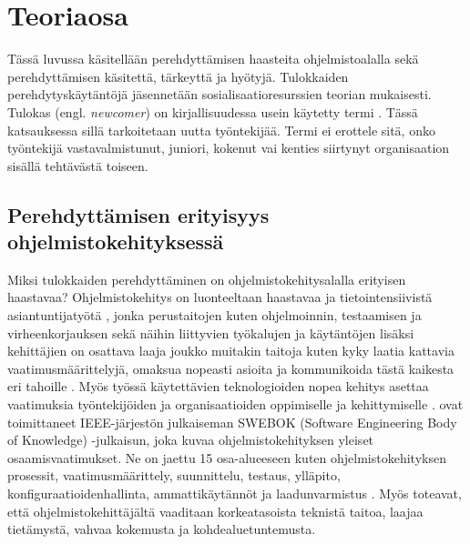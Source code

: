 \documentclass[utf8]{gradu3}
\begin{document}
\chapter{Teoriaosa}
\label{paaluku-teoria}

Tässä luvussa käsitellään perehdyttämisen haasteita ohjelmistoalalla sekä perehdyttämisen käsitettä, tärkeyttä ja hyötyjä. Tulokkaiden perehdytyskäytäntöjä jäsennetään sosialisaatioresurssien teorian \parencite{saks-gruman-2012} mukaisesti. Tulokas (engl. \textit{newcomer}) on kirjallisuudessa usein käytetty termi %
\parencites%
    [mm.][]{matturro-ym-2017}%
    {bauer-erdogan-2012}%
    {begel-simon-2008-all-over-again}%
    {steinmacher-ym-2015}%
    {britto-ym-2019}%
\relax.
%
Tässä katsauksessa sillä tarkoitetaan uutta työntekijää. Termi ei erottele sitä, onko työntekijä vastavalmistunut, juniori, kokenut vai kenties siirtynyt organisaation sisällä tehtävästä toiseen.

\section{Perehdyttämisen erityisyys ohjelmistokehityksessä}
\label{luku-perehdyttämisen-erityisyys-ohjelmistoalalla}

Miksi tulokkaiden perehdyttäminen on ohjelmistokehitysalalla erityisen haastavaa? Ohjelmistokehitys on luonteeltaan haastavaa ja tietointensiivistä asiantuntijatyötä \parencite{viana-ym-2014}, jonka perustaitojen kuten ohjelmoinnin, testaamisen ja virheenkorjauksen sekä näihin liittyvien työkalujen ja käytäntöjen lisäksi kehittäjien on osattava laaja joukko muitakin taitoja kuten kyky laatia kattavia vaatimusmäärittelyjä, omaksua nopeasti asioita ja kommunikoida tästä kaikesta eri tahoille %
\parencites%
    {tejera-hernández-ym-2018}%
    {begel-simon-2008-all-over-again}%
\relax.
%
Myös työssä käytettävien teknologioiden nopea kehitys asettaa vaatimuksia työntekijöiden ja organisaatioiden oppimiselle ja kehittymiselle \parencite{tejera-hernández-ym-2018}. \textcite{swebok} ovat toimittaneet IEEE-järjestön julkaiseman SWEBOK (Software Engineering Body of Knowledge) -julkaisun, joka kuvaa ohjelmistokehityksen yleiset osaamisvaatimukset. Ne on jaettu 15 osa-alueeseen kuten ohjelmistokehityksen prosessit, vaatimusmäärittely, suunnittelu, testaus, ylläpito, konfiguraatioidenhallinta, ammattikäytännöt ja laadunvarmistus \parencite{swebok}. Myös \textcite{gregory-ym-2020} toteavat, että ohjelmistokehittäjältä vaaditaan korkeatasoista teknistä taitoa, laajaa tietämystä, vahvaa kokemusta ja kohdealuetuntemusta. 
\end{document}
